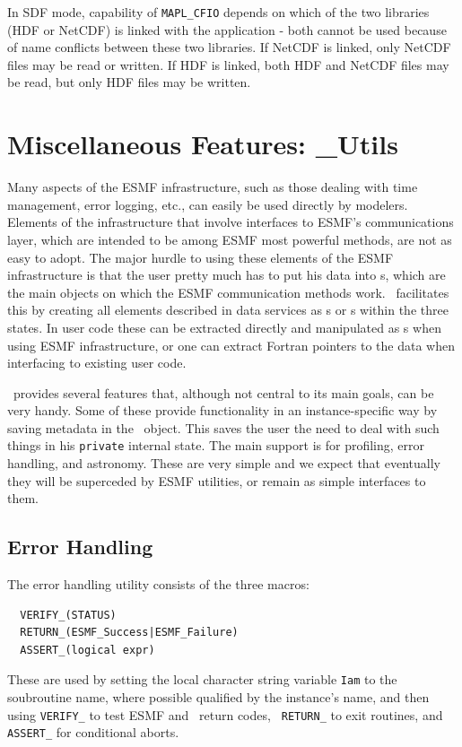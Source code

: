 In SDF mode, capability of {\tt MAPL\_CFIO} depends on which of the two
libraries (HDF or NetCDF) is linked with the application - both cannot
be used because of name conflicts between these two libraries. If NetCDF is
linked, only NetCDF  files may be read or written. If HDF is linked, both HDF 
and NetCDF files may be read, but only HDF files may be written.


\section{Miscellaneous Features: \ggn\_{Utils}}

Many aspects of the ESMF infrastructure, such as those dealing with
time management, error logging, etc., can easily be used directly by
modelers. Elements of the infrastructure that involve interfaces to
ESMF's communications layer, which are intended to be among ESMF most
powerful methods, are not as easy to adopt. The major hurdle to using
these elements of the ESMF infrastructure is that the user pretty much
has to put his data into \fld s, which are the main objects on
which the ESMF communication methods work. \ggn\  facilitates this by
creating all elements described in data services as \fld s or \bdl s
within the three states. In user code these can be extracted directly
and manipulated as \fld s when using ESMF infrastructure,
or one can extract Fortran pointers to the data when interfacing to 
existing user code. 


\ggn\  provides several features that, although not central to its main 
goals, can be very handy. Some of these provide
functionality in an instance-specific way by saving metadata in the
\ggn\  object. This saves the user the need to deal with such things in
his \texttt{private} internal state. The main support is for profiling, error
handling, and astronomy. These are very simple and we expect that
eventually they will be superceded by ESMF utilities, or remain as
simple interfaces to them.

\subsection{Error Handling}
The error handling utility consists of the three macros:
\begin{verbatim}
  VERIFY_(STATUS)
  RETURN_(ESMF_Success|ESMF_Failure)
  ASSERT_(logical expr)
\end{verbatim}

These are used by setting the local character string variable {\tt Iam} to
the soubroutine name, where possible qualified by the instance's name,
and then using {\tt VERIFY\_} to test ESMF and \ggn\  return codes, {\tt
RETURN\_} to exit routines, and {\tt ASSERT\_} for conditional aborts. 

